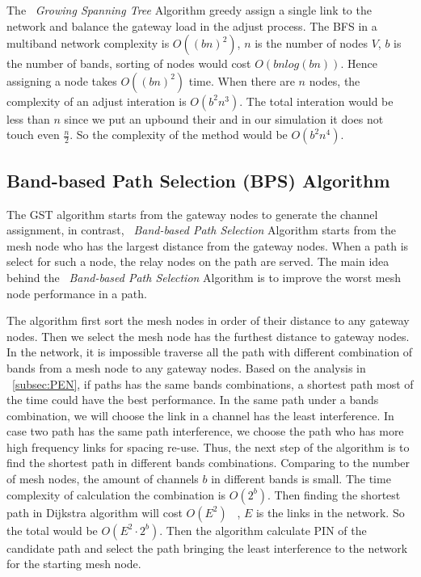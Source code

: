 The ~\emph{Growing Spanning Tree} Algorithm greedy assign a single link to the network and balance the gateway load in the adjust process. 
The BFS in a multiband network complexity is $O((bn)^2)$, $n$ is the number of nodes $V$, $b$ is the number of bands, sorting of nodes would cost $O(bnlog(bn))$. 
Hence assigning a node takes $O((bn)^2)$ time. When there are $n$ nodes, the complexity of an adjust interation is $O(b^2n^3)$.
The total interation would be less than $n$ since we put an upbound their and in our simulation it does not touch even $\frac{n}{2}$. So the complexity of the method would be $O(b^2n^4)$.










\subsection{Band-based Path Selection (BPS) Algorithm}
\label{subsec:step}

The GST algorithm starts from the gateway nodes to generate the channel assignment, in contrast, ~\emph{Band-based Path Selection} Algorithm starts from the mesh node who has the largest distance from the gateway nodes.
When a path is select for such a node, the relay nodes on the path are served. 
The main idea behind the ~\emph{Band-based Path Selection} Algorithm is to improve the worst mesh node performance in a path. 

The algorithm first sort the mesh nodes in order of their distance to any gateway nodes. Then we select the mesh node has the furthest distance to gateway nodes. In the network, it is impossible traverse all the path with different combination of bands from a mesh node to any gateway nodes. Based on the analysis in ~\ref{subsec:PEN}, if paths has the same bands combinations, a shortest path most of the time could have the best performance.
In the same path under a bands combination, we will choose the link in a channel has the least interference.
 In case two path has the same path interference, we choose the path who has more high frequency links for spacing re-use.
Thus, the next step of the algorithm is to find the shortest path in different bands combinations. Comparing to the number of mesh nodes, the amount of channels $b$ in different bands is small. The time complexity of calculation the combination is $O(2^b)$. 
Then finding the shortest path in Dijkstra algorithm will cost $O(E^2)$ ~\cite{golden1976shortest}, $E$ is the links in the network. So the total would be $O(E^2\cdot 2^b)$.
Then the algorithm calculate PIN of the candidate path and select the path bringing the least interference to the network for the starting mesh node.

